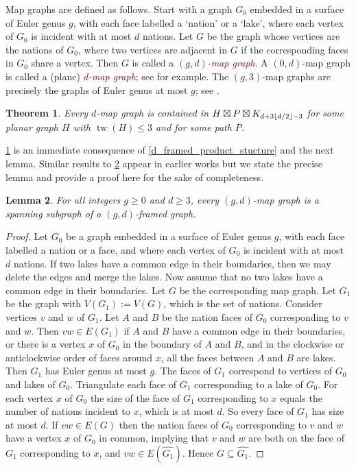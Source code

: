 \documentclass{patmorin}
\theoremstyle{plain}
\newtheorem{thm}{Theorem}
\newtheorem{lem}[thm]{Lemma}
\theoremstyle{definition}
\newcommand{\defin}[1]{\textcolor{Maroon}{\emph{#1}}}
\newcommand{\note}[2]{\noindent{\color{red}[#1:~#2]}}
\DeclareMathOperator{\tw}{tw}
\DeclarePairedDelimiter{\floor}{\lfloor}{\rfloor}
\renewcommand{\geq}{\geqslant}
\renewcommand{\leq}{\leqslant}
\begin{document}
Map graphs are defined as follows. Start with a graph $G_0$ embedded in a surface of Euler genus $g$, with each face labelled a `nation' or a `lake', where each vertex of $G_0$ is incident with at most $d$ nations. Let $G$ be the graph whose vertices are the nations of $G_0$, where two vertices are adjacent in $G$ if the corresponding faces in $G_0$ share a vertex. Then $G$ is called a \defin{$(g,d)$-map graph}.  A $(0,d)$-map graph is called a (plane) \defin{$d$-map graph}; see \citep{FLS-SODA12,CGP02} for example. The $(g,3)$-map graphs are precisely the graphs of Euler genus at most $g$; see \citep{dujmovic.eppstein.ea:structure}.

\note{DW}{This subsection needs a clean-up; define $(g,d)$-framed graph.}

\begin{thm}
\label{NewMapGraph}
Every $d$-map graph is contained in $H \boxtimes P \boxtimes K_{ d + 3\floor{d/2} -3 }$ for some planar graph $H$ with $\tw(H) \leq 3$ and for some path $P$.
\end{thm}

\cref{NewMapGraph} is an immediate consequence of \cref{d_framed_product_stucture} and the next lemma. Similar results to \cref{MewMapGraphLemma} appear in earlier works \cite{CGP06,BDGGMR,Brandenburg19,Brandenburg20} but we state the precise lemma and provide a proof here for the sake of completeness.

\begin{lem}
\label{MewMapGraphLemma}
For all integers $g\geq 0$ and $d\geq 3$, every $(g,d)$-map graph is a spanning subgraph of a $(g,d)$-framed graph.
\end{lem}

\begin{proof}
Let $G_0$ be a graph embedded in a surface of Euler genus $g$, with each face labelled a nation or a face, and where each vertex of $G_0$ is incident with at most $d$ nations. If two lakes have a common edge in their boundaries, then we may delete the edges and merge the lakes. Now assume that no two lakes have a common edge in their boundaries.
Let $G$ be the corresponding map graph.
Let $G_1$ be the graph with $V(G_1):=V(G)$, which is the set of nations.
Consider vertices $v$ and $w$ of $G_1$.
Let $A$ and $B$ be the nation faces of $G_0$ corresponding to $v$ and $w$.
Then $vw\in E(G_1)$ if $A$ and $B$ have a common edge in their boundaries,
or there is a vertex $x$ of $G_0$ in the boundary of $A$ and $B$, and in the clockwise or anticlockwise order of faces around $x$, all the faces between $A$ and $B$ are lakes.
Then $G_1$ has Euler genus at most $g$.
The faces of $G_1$ correspond to vertices of $G_0$ and lakes of $G_0$.
Triangulate each face of $G_1$ corresponding to a lake of $G_0$. For each vertex
$x$ of $G_0$ the size of the face of $G_1$ corresponding to $x$ equals the number of nations incident to $x$, which is at most $d$.
So every face of $G_1$ has size at most $d$.
If $vw\in E(G)$ then the nation faces of $G_0$ corresponding to $v$ and $w$ have a vertex $x$ of $G_0$ in common, implying that  $v$ and $w$ are both on the face of $G_1$ corresponding to $x$, and $vw\in E(\widehat{G_1})$. Hence $G\subseteq \widehat{G_1}$.
\end{proof}
\end{document}
